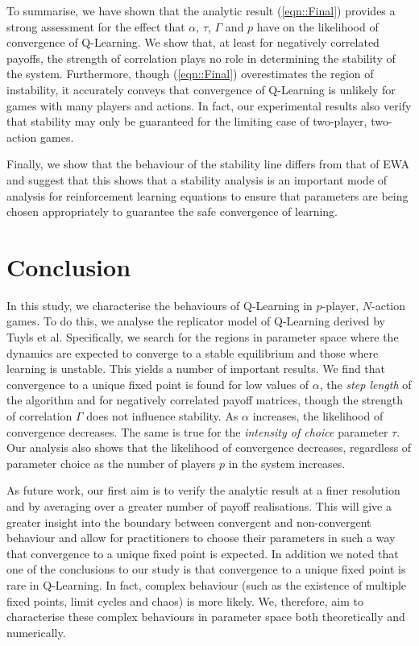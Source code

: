 \documentclass[sigconf,anonymous]{aamas}
\begin{document}
To summarise, we have shown that the analytic result
(\ref{eqn::Final}) provides a strong assessment for the effect that
$\alpha$, $\tau$, $\Gamma$ and $p$ have on the likelihood of
convergence of Q-Learning. We show that, at least for negatively
correlated payoffs, the strength of correlation plays no role in
determining the stability of the system. Furthermore, though
(\ref{eqn::Final}) overestimates the region of instability, it
accurately conveys that convergence of Q-Learning is unlikely for
games with many players and actions. In fact, our experimental results
also verify that stability may only be guaranteed for the limiting
case of two-player, two-action games.

Finally, we show that the behaviour of the stability line differs from
that of EWA and suggest that this shows that a stability analysis is
an important mode of analysis for reinforcement learning equations to
ensure that parameters are being chosen appropriately to guarantee the
safe convergence of learning.


\section{Conclusion}

In this study, we characterise the behaviours of Q-Learning in
$p$-player, $N$-action games. To do this, we analyse the replicator
model of Q-Learning derived by Tuyls et al. Specifically, we search
for the regions in parameter space where the dynamics are expected to
converge to a stable equilibrium and those where learning is
unstable. This yields a number of important results. We find that
convergence to a unique fixed point is found for low values of
$\alpha$, the \textit{step length} of the algorithm and for negatively
correlated payoff matrices, though the strength of correlation
$\Gamma$ does not influence stability. As $\alpha$ increases, the
likelihood of convergence decreases. The same is true for the
\textit{intensity of choice} parameter $\tau$. Our analysis also shows
that the likelihood of convergence decreases, regardless of parameter
choice as the number of players $p$ in the system increases.

As future work, our first aim is to verify the analytic result at a
finer resolution and by averaging over a greater number of payoff
realisations. This will give a greater insight into the boundary
between convergent and non-convergent behaviour and allow for
practitioners to choose their parameters in such a way that
convergence to a unique fixed point is expected. In addition we noted
that one of the conclusions to our study is that convergence to a
unique fixed point is rare in Q-Learning. In fact, complex behaviour
(such as the existence of multiple fixed points, limit cycles and
chaos) is more likely. We, therefore, aim to characterise these
complex behaviours in parameter space both theoretically and
numerically.
\end{document}
